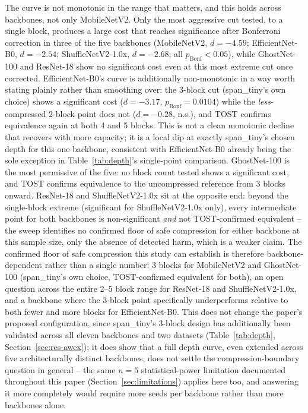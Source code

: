 \documentclass[11pt]{article}
\begin{document}
The curve is not monotonic in the range that matters, and this holds across backbones, not only MobileNetV2. Only the most aggressive cut tested, to a single block, produces a large cost that reaches significance after Bonferroni correction in three of the five backbones (MobileNetV2, $d{=}{-}4.59$; EfficientNet-B0, $d{=}{-}2.54$; ShuffleNetV2-1.0x, $d{=}{-}2.68$; all $p_{\text{Bonf}}{<}0.05$), while GhostNet-100 and ResNet-18 show no significant cost even at this most extreme cut once corrected. EfficientNet-B0's curve is additionally non-monotonic in a way worth stating plainly rather than smoothing over: the 3-block cut (span\_tiny's own choice) shows a significant cost ($d{=}{-}3.17$, $p_{\text{Bonf}}{=}0.0104$) while the \emph{less}-compressed 2-block point does not ($d{=}{-}0.28$, n.s.), and TOST confirms equivalence again at both 4 and 5 blocks. This is not a clean monotonic decline that recovers with more capacity; it is a local dip at exactly span\_tiny's chosen depth for this one backbone, consistent with EfficientNet-B0 already being the sole exception in Table~\ref{tab:depth}'s single-point comparison. GhostNet-100 is the most permissive of the five: no block count tested shows a significant cost, and TOST confirms equivalence to the uncompressed reference from 3 blocks onward. ResNet-18 and ShuffleNetV2-1.0x sit at the opposite end: beyond the single-block extreme (significant for ShuffleNetV2-1.0x only), every intermediate point for both backbones is non-significant \emph{and} not TOST-confirmed equivalent -- the sweep identifies no confirmed floor of safe compression for either backbone at this sample size, only the absence of detected harm, which is a weaker claim. The confirmed floor of safe compression this study can establish is therefore backbone-dependent rather than a single number: 3 blocks for MobileNetV2 and GhostNet-100 (span\_tiny's own choice, TOST-confirmed equivalent for both), an open question across the entire 2--5 block range for ResNet-18 and ShuffleNetV2-1.0x, and a backbone where the 3-block point specifically underperforms relative to both fewer and more blocks for EfficientNet-B0. This does not change the paper's proposed configuration, since span\_tiny's 3-block design has additionally been validated across all eleven backbones and two datasets (Table~\ref{tab:depth}, Section~\ref{sec:res-awex}); it does show that a full depth curve, even extended across five architecturally distinct backbones, does not settle the compression-boundary question in general -- the same $n=5$ statistical-power limitation documented throughout this paper (Section~\ref{sec:limitations}) applies here too, and answering it more completely would require more seeds per backbone rather than more backbones alone.
\end{document}
